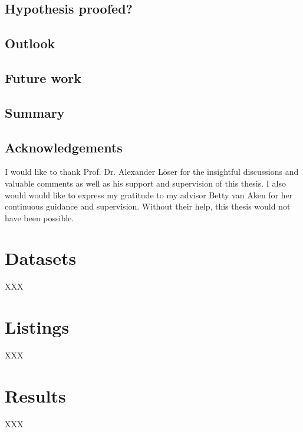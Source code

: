 \documentclass[11pt, a4paper]{book}
\begin{document}
\section{Hypothesis proofed?}
\section{Outlook}
\section{Future work}

\section{Summary}

\newpage

\section*{Acknowledgements}
I would like to thank Prof. Dr. Alexander Löser for the insightful discussions and valuable comments as well as his support and supervision of this thesis. I also would would like to express my gratitude to my advisor Betty van Aken for her continuous guidance and supervision. Without their help, this thesis would not have been possible.


\appendix
\renewcommand\chaptername{Appendix}

\chapter{Datasets}
XXX

\chapter{Listings}
XXX

\chapter{Results} 
XXX
\end{document}
